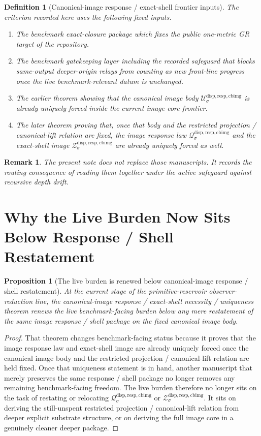 \documentclass[11pt]{article}
\newcommand{\CanonicalImageBody}[1]{\mathcal U_{#1}^{\mathrm{disp,resp,cbimg}}}
\newcommand{\CanonicalImageShell}[1]{\mathcal Z_{#1}^{\mathrm{disp,resp,cbimg}}}
\newcommand{\CanonicalImageResponseLaw}[1]{\mathscr Q_{#1}^{\mathrm{disp,resp,cbimg}}}
\newtheorem{definition}{Definition}
\newtheorem{proposition}{Proposition}
\newtheorem{remark}{Remark}
\begin{document}
\begin{definition}[Canonical-image response / exact-shell frontier inputs]
The criterion recorded here uses the following fixed inputs.
\begin{enumerate}
    \item The benchmark exact-closure package which fixes the public one-metric GR target of the repository.
    \item The benchmark gatekeeping layer including the recorded safeguard that blocks same-output deeper-origin relays from counting as new front-line progress once the live benchmark-relevant datum is unchanged.
    \item The earlier theorem showing that the canonical image body \(\CanonicalImageBody{\sigma}\) is already uniquely forced inside the current image-core frontier.
    \item The later theorem proving that, once that body and the restricted projection / canonical-lift relation are fixed, the image response law \(\CanonicalImageResponseLaw{\sigma}\) and the exact-shell image \(\CanonicalImageShell{\sigma}\) are already uniquely forced as well.
\end{enumerate}
\end{definition}

\begin{remark}
The present note does not replace those manuscripts. It records the routing consequence of reading them together under the active safeguard against recursive depth drift.
\end{remark}

\section{Why the Live Burden Now Sits Below Response / Shell Restatement}

\begin{proposition}[The live burden is renewed below canonical-image response / shell restatement]
At the current stage of the primitive-reservoir observer-reduction line, the canonical-image response / exact-shell necessity / uniqueness theorem renews the live benchmark-facing burden below any mere restatement of the same image response / shell package on the fixed canonical image body.
\end{proposition}

\begin{proof}
That theorem changes benchmark-facing status because it proves that the image response law and exact-shell image are already uniquely forced once the canonical image body and the restricted projection / canonical-lift relation are held fixed. Once that uniqueness statement is in hand, another manuscript that merely preserves the same response / shell package no longer removes any remaining benchmark-facing freedom. The live burden therefore no longer sits on the task of restating or relocating \(\CanonicalImageResponseLaw{\sigma}\) or \(\CanonicalImageShell{\sigma}\). It sits on deriving the still-unspent restricted projection / canonical-lift relation from deeper explicit substrate structure, or on deriving the full image core in a genuinely cleaner deeper package.
\end{proof}
\end{document}
